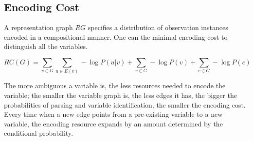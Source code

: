 \documentclass{article} %
\theoremstyle{remark}
\begin{document}


\subsection{Encoding Cost}
\label{sup:encoding_cost}


A representation graph $RG$ specifies a distribution of observation instances encoded in a compositional manner. One can the minimal encoding cost to distinguish all the variables.

\begin{equation}\label{eq:complexity}
    RC(G) = \sum_{v \in G} \sum_{ u\in E(v)} -\log P(u|v) + \sum_{v \in G} -\log P(v) + \sum_{c \in G}    -\log P(c)   
\end{equation}

The more ambiguous a variable is, the less resources needed to encode the variable; the smaller the variable graph is, the less edges it has, the bigger the probabilities of parsing and variable identification, the smaller the encoding cost. Every time when a new edge points from a pre-existing variable to a new variable, the encoding resource expands by an amount determined by the conditional probability. 

\end{document}
